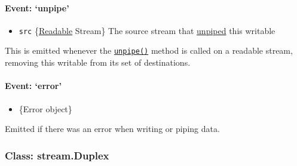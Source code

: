 \paragraph{Event: `unpipe'}\label{event-unpipe}

\begin{itemize}
\itemsep1pt\parskip0pt
\item
  \texttt{src}
  \{\hyperref[streamux5fclassux5fstreamux5freadable]{Readable} Stream\}
  The source stream that
  \hyperref[streamux5freadableux5funpipeux5fdestination]{unpiped} this
  writable
\end{itemize}

This is emitted whenever the
\hyperref[streamux5freadableux5funpipeux5fdestination]{\texttt{unpipe()}}
method is called on a readable stream, removing this writable from its
set of destinations.

\begin{Shaded}
\begin{Highlighting}[]
 \NormalTok{();}
 \NormalTok{();}
\NormalTok{(}\NormalTok{, }
  \NormalTok{(}\NormalTok{);}
\NormalTok{\});}
\end{Highlighting}
\end{Shaded}

\paragraph{Event: `error'}\label{event-error-1}

\begin{itemize}
\itemsep1pt\parskip0pt
\item
  \{Error object\}
\end{itemize}

Emitted if there was an error when writing or piping data.

\subsubsection{Class: stream.Duplex}\label{class-stream.duplex}

